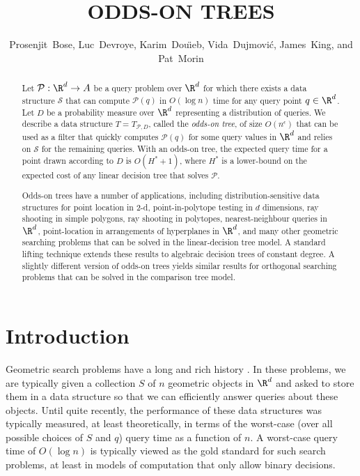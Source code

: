 \documentclass{patmorin}
\title{\MakeUppercase{Odds-On Trees}}
\author{Prosenjit~Bose, 
        Luc~Devroye,
	Karim~Dou\"{\i}eb, 
	Vida~Dujmovi\'c, 
	James~King, and 
	Pat~Morin}
\newcommand{\eps}{\epsilon}
\begin{document}
\maketitle

\begin{abstract}
  Let $\mathcal{P}:\R^d\rightarrow A$ be a query problem over $\R^d$
  for which there exists a data structure $\mathcal{S}$ that can compute
  $\mathcal{P}(q)$ in $O(\log n)$ time for any query point $q\in\R^d$.
  Let $D$ be a probability measure over $\R^d$ representing a distribution
  of queries.  We describe a data structure $T=T_{\mathcal{P},D}$, called
  the \emph{odds-on tree}, of size $O(n^\eps)$ that can be used as a
  filter that quickly computes $\mathcal{P}(q)$ for some query values in
  $\R^d$ and relies on $\mathcal{S}$ for the remaining queries.  With an
  odds-on tree, the expected query time for a point drawn according to
  $D$ is $O(H^*+1)$, where $H^*$ is a lower-bound on the expected cost
  of any linear decision tree that solves $\mathcal{P}$.

  Odds-on trees have a number of applications, including
  distribution-sensitive data structures for point location in 2-d,
  point-in-polytope testing in $d$ dimensions, ray shooting in simple
  polygons, ray shooting in polytopes, nearest-neighbour queries in
  $\R^d$, point-location in arrangements of hyperplanes in $\R^d$,
  and many other geometric searching problems that can be solved in the
  linear-decision tree model.  A standard lifting technique extends these
  results to algebraic decision trees of constant degree.  A slightly
  different version of odds-on trees yields similar results for orthogonal
  searching problems that can be solved in the comparison tree model.
\end{abstract}

\section{Introduction}

Geometric search problems have a long and rich history
\cite{ae99,g00chapter,ms05}. In these problems, we are typically
given a collection $S$ of $n$ geometric objects in $\R^d$ and asked
to store them in a data structure so that we can efficiently answer
queries about these objects. Until quite recently, the performance of
these data structures was typically measured, at least theoretically,
in terms of the worst-case (over all possible choices of $S$ and $q$)
query time as a function of $n$.  A worst-case query time of $O(\log
n)$ is typically viewed as the gold standard for such search problems,
at least in models of computation that only allow binary decisions.
\end{document}
